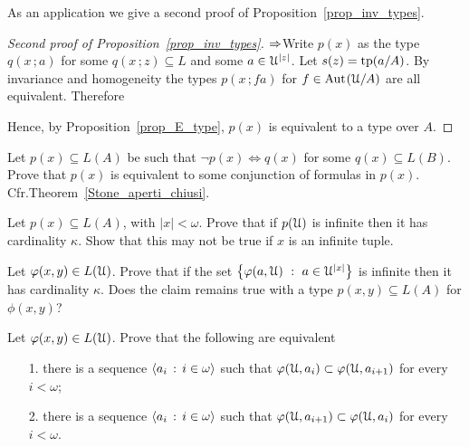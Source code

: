 \documentclass[creche.tex]{subfiles}
\begin{document}
As an application we give a second proof of Proposition~\ref{prop_inv_types}.

\begin{proof}[Second proof of Proposition~\ref{prop_inv_types}] $\Rightarrow$\quad  Write $p(x)$ as the type $q(x\,;a)$ for some $q(x\,;z)\subseteq L$ and some $a\in\EuScript U^{|z|}$. Let $s(z)={\rm tp}(a/A)$. By invariance and homogeneity the types $p(x\,;fa)$ for $f\in\textrm{Aut\kern.15ex}(\EuScript U/A)$ are all equivalent. Therefore

\smallskip

\smallskip

\smallskip

Hence, by Proposition~\ref{prop_E_type}, $p(x)$ is equivalent to a type over $A$.
\end{proof}


\begin{exercise}\label{ex_clopen_definibili}
Let $p(x)\subseteq L(A)$ be such that $\neg p(x)\iff q(x)$ for some $q(x)\subseteq L(B)$. Prove that $p(x)$ is equivalent to some conjunction of formulas in $p(x)$. Cfr.\@ Theorem~\ref{Stone_aperti_chiusi}.\QED 
\end{exercise}


\begin{exercise}\label{cadinalitafinitasaturazione}
Let $p(x)\subseteq L(A)$, with $|x|<\omega$. Prove that if $p(\EuScript U)$ is infinite then it has cardinality $\kappa$. Show that this may not be true if $x$ is an infinite tuple.\QED 
\end{exercise}

\begin{exercise}\label{cadinalitafinitasaturazioneinsiemi}
Let $\varphi(x,y)\in L(\EuScript U)$. Prove that if the set $\big\{\phi(a,\U)\ :\ a\in\U^{|x|}\big\}$ is infinite then it has cardinality $\kappa$. Does the claim remains true with a type $p(x,y)\subseteq L(A)$ for $\phi(x,y)$?\QED 
\end{exercise}

\begin{exercise} 
Let $\varphi(x,y)\in L(\EuScript U)$. Prove that the following are equivalent
\begin{itemize}
\item[1.] there is a sequence $\langle a_i\,:\,i\in\omega\rangle$ such that $\varphi(\EuScript U,a_i)\subset\varphi(\EuScript U,a_{i+1})$ for every $i<\omega$;
\item[2.] there is a sequence $\langle a_i\,:\,i\in\omega\rangle$ such that $\varphi(\EuScript U,a_{i+1})\subset\varphi(\EuScript U,a_i)$ for every $i<\omega$.\QED  
\end{itemize}
\end{exercise}
\end{document}
